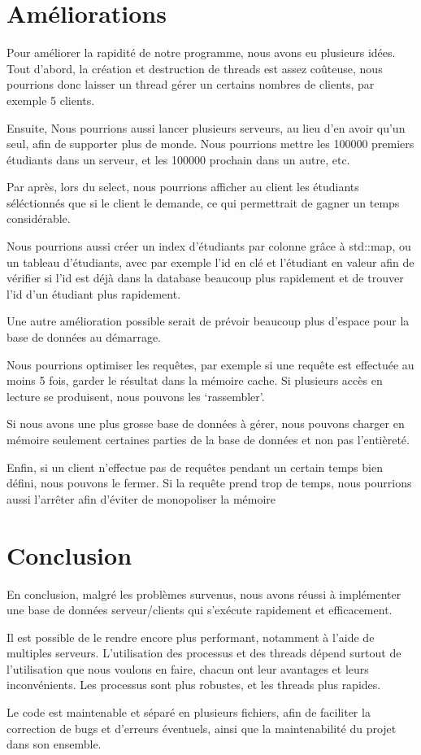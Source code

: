 \documentclass[utf8]{article}
\begin{document}
\begin{large}
\par
\section{Améliorations}
\par
\indent

Pour améliorer la rapidité de notre programme, nous avons eu plusieurs idées.
Tout d'abord, la création et destruction de threads est assez coûteuse, nous
pourrions donc laisser un thread gérer un certains nombres de clients, par
exemple 5 clients.
\par

\par
\indent

Ensuite, Nous pourrions aussi lancer plusieurs serveurs, au lieu d'en avoir qu'un seul,
afin de supporter plus de monde. Nous pourrions mettre les 100000 premiers
étudiants dans un serveur, et les 100000 prochain dans un autre, etc.

Par après, lors du select, nous pourrions afficher au client les étudiants
séléctionnés que si le client le demande, ce qui permettrait de gagner un temps
considérable.

Nous pourrions aussi créer un index d'étudiants par colonne grâce à std::map, ou
un tableau d'étudiants, avec par exemple l'id en clé et l'étudiant en valeur
afin de vérifier si l'id est déjà dans la database beaucoup plus rapidement et
de trouver l'id d'un étudiant plus rapidement.

Une autre amélioration possible serait de prévoir beaucoup plus d'espace pour la
base de données au démarrage.

Nous pourrions optimiser les requêtes, par exemple si une requête est effectuée au
moins 5 fois, garder le résultat dans la mémoire cache. Si plusieurs accès en
lecture se produisent, nous pouvons les `rassembler'.

Si nous avons une plus grosse base de données à gérer, nous pouvons charger en
mémoire seulement certaines parties de la base de données et non pas l'entièreté.

Enfin, si un client n'effectue pas de requêtes pendant un certain temps bien
défini, nous pouvons le fermer. Si la requête prend trop de temps, nous
pourrions aussi l'arrêter afin d'éviter de monopoliser la mémoire
\par
\section{Conclusion}
\par
\indent
En conclusion, malgré les problèmes survenus, nous avons réussi à implémenter
une base de données serveur/clients qui s'exécute rapidement et
efficacement.
\par 
Il est possible de le rendre encore plus performant, notamment à l'aide de
multiples serveurs. L'utilisation des processus et des threads dépend surtout de
l'utilisation que nous voulons en faire, chacun ont leur avantages et leurs
inconvénients. Les processus sont plus robustes, et les threads plus rapides.

Le code est maintenable et séparé en plusieurs fichiers,
afin de faciliter la correction de bugs et d'erreurs éventuels, ainsi que la
maintenabilité du projet dans son ensemble.
\par

\end{large}
\end{document}

